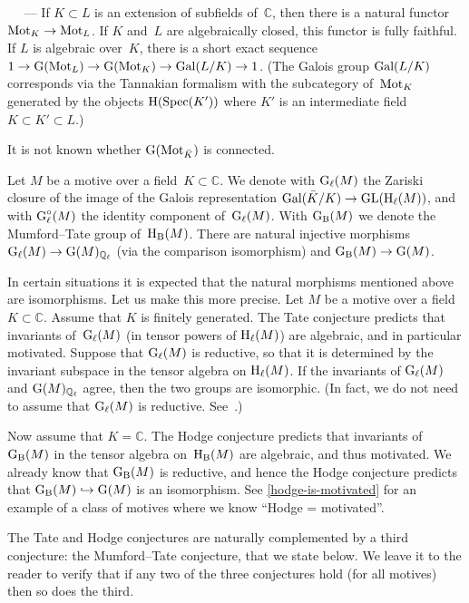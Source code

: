 \documentclass[10pt,twoside,leqno]{article}
\renewcommand{\paragraph}[1]{\par\bigskip\refstepcounter{subsection}%
 {\normalfont\normalsize\scshape\noindent\thesubsection%
 \ifthenelse{\equal{#1}{}}%
 {}%
 {\ \textls{#1.}}%
 \ ---}%
}
\numberwithin{equation}{subsection}
\newcommand{\into}{\hookrightarrow}
\newcommand{\QQ}{\mathbb{Q}}
\newcommand{\QQl}{\QQ_{\ell}}
\newcommand{\CC}{\mathbb{C}}
\newcommand{\Spec}{\textnormal{Spec}}
\newcommand{\Gal}{\textnormal{Gal}}
\newcommand{\GL}{\textnormal{GL}}
\newcommand{\HH}{\textnormal{H}}
\newcommand{\Hl}{\HH_{\ell}}
\newcommand{\HB}{\HH_{\textnormal{B}}}
\newcommand{\Mot}{\textnormal{Mot}}
\newcommand{\GG}{\textnormal{G}}
\newcommand{\GB}{\GG_{\textnormal{B}}}
\newcommand{\Gl}{\GG_{\ell}}
\newcommand{\Glc}{\Gl^{\circ}}
\begin{document}
\paragraph{} %
If $K \subset L$ is an extension of subfields of~$\CC$,
then there is a natural functor $\Mot_K \to \Mot_L$.
If $K$ and~$L$ are algebraically closed, this functor is fully faithful.
If $L$ is algebraic over~$K$, there is a short exact sequence
$1 \to \GG(\Mot_L) \to \GG(\Mot_K) \to \Gal(L/K) \to 1$.
(The Galois group $\Gal(L/K)$ corresponds via the Tannakian formalism
with the subcategory of~$\Mot_K$ generated by
the objects $\HH(\Spec(K'))$ where $K'$ is an intermediate field
$K \subset K' \subset L$.)

It is not known whether $\GG(\Mot_{\bar K})$ is connected.

\begin{notation} %
 Let $M$ be a motive over a field~$K \subset \CC$.
 We denote with $\Gl(M)$ the Zariski closure of the image of
 the Galois representation $\Gal(\bar K/K) \to \GL(\Hl(M))$,
 and with $\Glc(M)$ the identity component of~$\Gl(M)$.
 With $\GB(M)$ we denote the Mumford--Tate group of~$\HB(M)$.
 There are natural injective morphisms 
 $\Gl(M) \to \GG(M)_{\QQl}$ (via the comparison isomorphism)
 and $\GB(M) \to \GG(M)$.
\end{notation}

\begin{remark} %
 In certain situations it is expected that the natural morphisms mentioned
 above are isomorphisms.
 Let us make this more precise.
 Let $M$ be a motive over a field~$K \subset \CC$.
 Assume that $K$ is finitely generated.
 The Tate conjecture predicts that invariants of~$\Gl(M)$
 (in tensor powers of $\Hl(M)$) are algebraic,
 and in particular motivated.
 Suppose that $\Gl(M)$ is reductive, so that it is determined
 by the invariant subspace in the tensor algebra on $\Hl(M)$.
 If the invariants of $\Gl(M)$ and $\GG(M)_{\QQl}$ agree,
 then the two groups are isomorphic.
 (In fact, we do not need to assume that $\Gl(M)$ is reductive.
 See~\cite{Moonen_remark}.)

 Now assume that $K = \CC$.
 The Hodge conjecture predicts that
 invariants of $\GB(M)$ in the tensor algebra on~$\HB(M)$
 are algebraic, and thus motivated.
 We already know that $\GB(M)$ is reductive,
 and hence the Hodge conjecture predicts that
 $\GB(M) \into \GG(M)$ is an isomorphism.
 See \cref{hodge-is-motivated} for an example
 of a class of motives where we know ``Hodge = motivated''.

 The Tate and Hodge conjectures are naturally complemented
 by a third conjecture: the Mumford--Tate conjecture,
 that we state below.
 We leave it to the reader to verify
 that if any two of the three conjectures hold (for all motives)
 then so does the third.
\end{remark}
\end{document}
